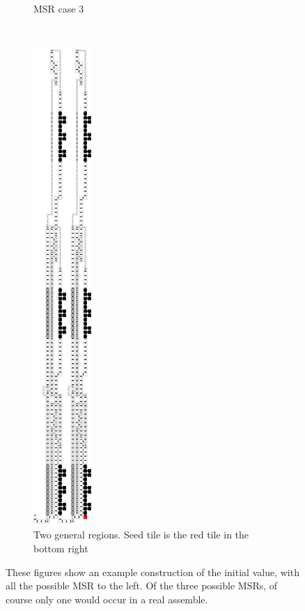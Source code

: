 \begin{figure}[H]
\begin{subfigure}[t]{0.24\textwidth}
        \caption{\label{fig:initial_case3_msr} MSR case 3}
    \end{subfigure}%
    ~
    \begin{subfigure}[t]{0.24\textwidth}
        \centering
        \includegraphics[width=0.24\textwidth]{initial_value_general}
        \caption{\label{fig:initial_general} Two general regions. Seed tile is the red tile in the bottom right}
    \end{subfigure}%
    \caption{\label{fig:initial_value_assemblies} These figures show an example construction of the initial value,
    with all the possible MSR to the left. Of the three possible MSRs, of course only one would occur in a real assemble.}
\end{figure}


